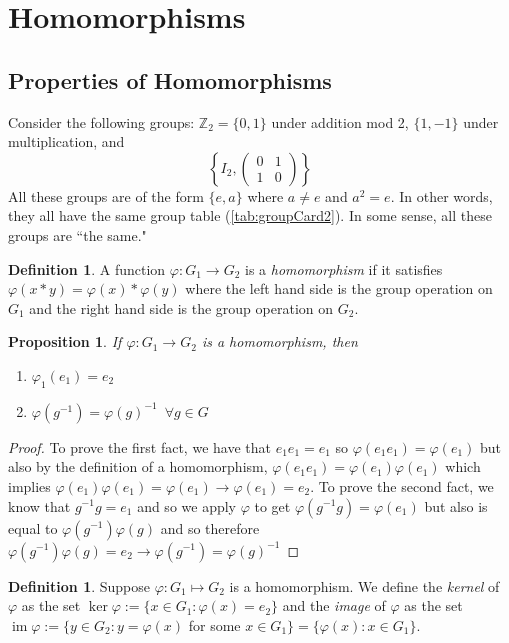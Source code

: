 \documentclass{article}
\newcommand{\Z}{\mathbb{Z}}
\DeclareMathOperator{\im}{im}
\newtheorem{proposition}[theorem]{Proposition}
\theoremstyle{definition}
\newtheorem{definition}[theorem]{Definition}
\begin{document}
\section{Homomorphisms}
\subsection{Properties of Homomorphisms}
Consider the following groups: $\Z_2=\{0,1\}$ under addition mod 2, $\{1,-1\}$ under multiplication, and  
\begin{equation*}
    \left\{ I_2,\begin{pmatrix}
        0&1\\1&0
    \end{pmatrix} \right\}
\end{equation*}
All these groups are of the form $\{e,a\}$ where $a\neq e$ and $a^2=e$. In other words, they all have the same group table (\ref{tab:groupCard2}). In some sense, all these groups are ``the same." 
\begin{definition}
    A function $\varphi:G_1 \to G_2$ is a \emph{homomorphism} if it satisfies $\varphi(x*y)=\varphi(x)*\varphi(y)$ where the left hand side is the group operation on $G_1$ and the right hand side is the group operation on $G_2$.
\end{definition}

\begin{proposition}
    If $\varphi : G_1\to G_2$ is a homomorphism, then 
    \begin{enumerate}
        \item $\varphi_1(e_1)=e_2$
        \item $\varphi(g^{-1})=\varphi (g)^{-1} \,\,\, \forall g\in G$
    \end{enumerate}
\end{proposition}
\begin{proof}
    To prove the first fact, we have that $e_1e_1=e_1$ so $\varphi (e_1e_1)=\varphi(e_1)$ but also by the definition of a homomorphism, $\varphi (e_1e_1) = \varphi(e_1)\varphi(e_1)$ which implies $\varphi(e_1)\varphi(e_1)=\varphi(e_1) \rightarrow \varphi(e_1)=e_2$. To prove the second fact, we know that $g^{-1}g=e_1$ and so we apply $\varphi$ to get $\varphi(g^{-1}g)=\varphi(e_1)$ but also is equal to $\varphi(g^{-1})\varphi(g)$ and so therefore $\varphi(g^{-1})\varphi(g)=e_2\rightarrow \varphi(g^{-1})=\varphi(g)^{-1}$  
\end{proof}
\begin{definition}
    Suppose $\varphi: G_1 \mapsto G_2$ is a homomorphism. We define the \emph{kernel} of $\varphi$ as the set $\ker \varphi:= \{x\in G_1: \varphi(x)=e_2\}$ and the \emph{image} of $\varphi$ as the set $\im \varphi := \{y\in G_2:y=\varphi(x)$ for some $x\in G_1\}=\{\varphi(x):x\in G_1\}$.
\end{definition}
\end{document}
